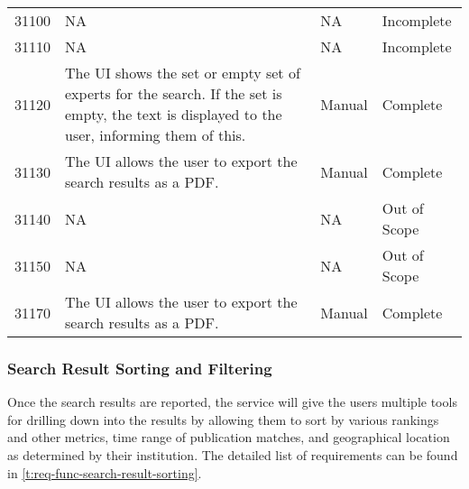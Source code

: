 \begin{table}[ht!]
\begin{tabular}{l p{\requirementwidth} p{\matrixwidth} p{\matrixwidth}}
        31100 & NA & NA & Incomplete \\ 
        31110 & NA & NA & Incomplete \\ 
        31120 & The UI shows the set or empty set of experts for the search. If the set is empty, the text is displayed to the user, informing them of this. & Manual & Complete \\ 
        31130 & The UI allows the user to export the search results as a PDF. & Manual & Complete \\ 
        31140 & NA & NA & Out of Scope \\ 
        31150 & NA & NA & Out of Scope \\ 
        31170 & The UI allows the user to export the search results as a PDF. & Manual & Complete \\
    \end{tabular}
\end{table}

\subsubsection{Search Result Sorting and Filtering}

Once the search results are reported, the service will give the users multiple tools for drilling down into the results by allowing them to sort by various rankings and other metrics, time range of publication matches, and geographical location as determined by their institution. The detailed list of requirements can be found in \autoref{t:req-func-search-result-sorting}.

